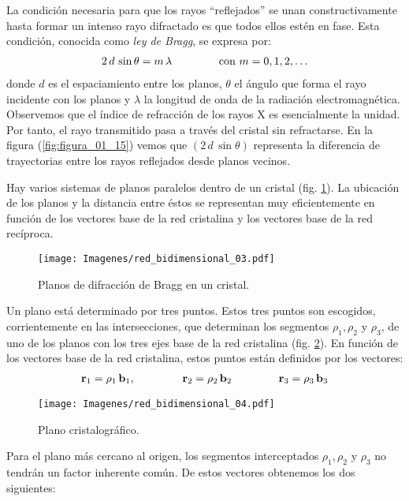 \documentclass[12pt]{article}
\begin{document}
La condición necesaria para que los rayos \enquote{reflejados} se unan constructivamente hasta formar un intenso rayo difractado es que todos ellos estén en fase. Esta condición, conocida como \emph{ley de Bragg}, se expresa por:
\begin{align*}
    2 \, d \, \sin \theta = m \, \lambda \hspace{1.5cm} \text{con } m = 0, 1, 2, \ldots
\end{align*}
donde $d$ es el espaciamiento entre los planos, $\theta$ el ángulo que forma el rayo incidente con los planos y $\lambda$ la longitud de onda de la radiación electromagnética. Observemos que el índice de refracción de los rayos X es esencialmente la unidad. Por tanto, el rayo transmitido pasa a través del cristal sin refractarse. En la figura (\ref{fig:figura_01_15}) vemos que $(2 \, d \, \sin \theta)$ representa la diferencia de trayectorias entre los rayos reflejados desde planos vecinos.
\par
Hay varios sistemas de planos paralelos dentro de un cristal (fig. \ref{fig:figura_01_16}). La ubicación de los planos y la distancia entre éstos se representan muy eficientemente en función de los vectores base de la red cristalina y los vectores base de la red recíproca. 
\begin{figure}[H]
    \centering
    \texttt{[image: Imagenes/red\_bidimensional\_03.pdf]}
    \caption{Planos de difracción de Bragg en un cristal.}
    \label{fig:figura_01_16}
\end{figure}
Un plano está determinado por tres puntos. Estos tres puntos son escogidos, corrientemente en las intersecciones, que determinan los segmentos $\rho_{1}, \rho_{2}$ y $\rho_{3}$, de uno de los planos con los tres ejes base de la red cristalina (fig. \ref{fig:figura_01_17}). En función de los vectores base de la red cristalina, estos puntos están definidos por los vectores:
\begin{align*}
    \vb{r}_{1} = \rho_{1} \, \vb{b}_{1}, \hspace{1.5cm} \vb{r}_{2} =\rho_{2} \, \vb{b}_{2} \hspace{1.5cm} \vb{r}_{3} = \rho_{3} \, \vb{b}_{3}
\end{align*}
\begin{figure}[H]
    \centering
    \texttt{[image: Imagenes/red\_bidimensional\_04.pdf]}
    \caption{Plano cristalográfico.}
    \label{fig:figura_01_17}
\end{figure}
Para el plano más cercano al origen, los segmentos interceptados $\rho_{1}, \rho_{2}$ y $\rho_{3}$ no tendrán un factor inherente común. De estos vectores obtenemos los dos siguientes:
\end{document}
